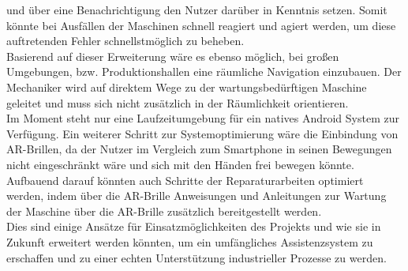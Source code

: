 und über eine Benachrichtigung den Nutzer darüber in Kenntnis setzen. Somit könnte bei Ausfällen der Maschinen schnell reagiert und agiert werden, um diese auftretenden 
Fehler schnellstmöglich zu beheben. 
\\ 
Basierend auf dieser Erweiterung wäre es ebenso möglich, bei großen Umgebungen, bzw. Produktionshallen eine räumliche Navigation einzubauen. Der Mechaniker wird auf 
direktem Wege zu der wartungsbedürftigen Maschine geleitet und muss sich nicht zusätzlich in der Räumlichkeit orientieren. 
\\ 
\linebreak
Im Moment steht nur eine Laufzeitumgebung für ein natives Android System zur Verfügung. Ein weiterer Schritt zur Systemoptimierung wäre die Einbindung von \acs{AR}-Brillen, 
da der Nutzer im Vergleich zum Smartphone in seinen Bewegungen nicht eingeschränkt wäre und sich mit den Händen frei bewegen könnte. 
\\ 
Aufbauend darauf könnten auch Schritte der Reparaturarbeiten optimiert werden, indem über die \acs{AR}-Brille Anweisungen und Anleitungen zur Wartung der 
Maschine über die \acs{AR}-Brille zusätzlich bereitgestellt werden. 
\\ 
\linebreak
Dies sind einige Ansätze für Einsatzmöglichkeiten des Projekts und wie sie in Zukunft erweitert werden könnten, um ein umfängliches Assistenzsystem zu erschaffen und zu einer 
echten Unterstützung industrieller Prozesse zu werden.  
